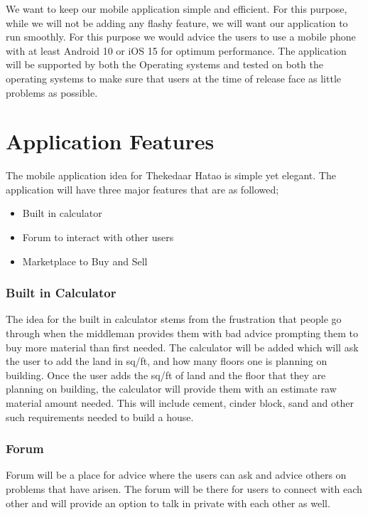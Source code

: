 \documentclass{article}
\begin{document}
We want to keep our mobile application simple and efficient. For this purpose,
while we will not be adding any flashy feature, we will want our application to
run smoothly. For this purpose we would advice the users to use a mobile phone
with at least Android 10 or iOS 15 for optimum performance. The application will
be supported by both the Operating systems and tested on both the operating
systems to make sure that users at the time of release face as little
problems as possible.

\section*{Application Features}

The mobile application idea for Thekedaar Hatao is simple yet elegant. The
application will have three major features that are as followed;

\begin{itemize}

        \item Built in calculator
        \item Forum to interact with other users
        \item Marketplace to Buy and Sell

\end{itemize}

\subsubsection*{Built in Calculator}

The idea for the built in calculator stems from the frustration that people go
through when the middleman provides them with bad advice prompting them to buy
more material than first needed. The calculator will be added which will ask
the user to add the land in sq/ft, and how many floors one is planning on
building. Once the user adds the sq/ft of land and the floor that they are
planning on building, the calculator will provide them with an estimate raw
material amount needed. This will include cement, cinder block, sand and other
such requirements needed to build a house.


\subsubsection*{Forum}

Forum will be a place for advice where the users can ask and advice others on
problems that have arisen. The forum will be there for users to connect with
each other and will provide an option to talk in private with each other as
well.
\end{document}
